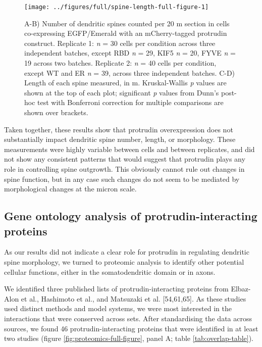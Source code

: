 \documentclass[
  12pt,
  a4paper,
]{book}
\begin{document}
\begin{figure}
\texttt{[image: ../figures/full/spine-length-full-figure-1]} \caption[Protrudin effect on dendritic spine length]{A-B) Number of dendritic spines counted per 20 \textmu{}m section in cells co-expressing EGFP/Emerald with an mCherry-tagged protrudin construct. Replicate 1: \emph{n} = 30 cells per condition across three independent batches, except \textDelta{}RBD \emph{n} = 29, \textDelta{}KIF5 \emph{n} = 20, \textDelta{}FYVE \emph{n} = 19 across two batches. Replicate 2: \emph{n} = 40 cells per condition, except WT and \textDelta{}ER \emph{n} = 39, across three independent batches. C-D) Length of each spine measured, in \textmu{}m. Kruskal-Wallis \emph{p} values are shown at the top of each plot; significant \emph{p} values from Dunn's post-hoc test with Bonferroni correction for multiple comparisons are shown over brackets.}\label{fig:spine-length-full-figure}
\end{figure}

Taken together, these results show that protrudin overexpression does not substantially impact dendritic spine number, length, or morphology. These measurements were highly variable between cells and between replicates, and did not show any consistent patterns that would suggest that protrudin plays any role in controlling spine outgrowth. This obviously cannot rule out changes in spine function, but in any case such changes do not seem to be mediated by morphological changes at the micron scale.

\hypertarget{GO-analysis}{%
\subsection{Gene ontology analysis of protrudin-interacting proteins}\label{GO-analysis}}

As our results did not indicate a clear role for protrudin in regulating dendritic spine morphology, we turned to proteomic analysis to identify other potential cellular functions, either in the somatodendritic domain or in axons.

We identified three published lists of protrudin-interacting proteins from Elbaz-Alon et al., Hashimoto et al., and Matsuzaki et al. {[}54,61,65{]}. As these studies used distinct methods and model systems, we were most interested in the interactions that were conserved across sets. After standardising the data across sources, we found 46 protrudin-interacting proteins that were identified in at least two studies (figure \ref{fig:proteomics-full-figure}, panel A; table \ref{tab:overlap-table}).
\end{document}
